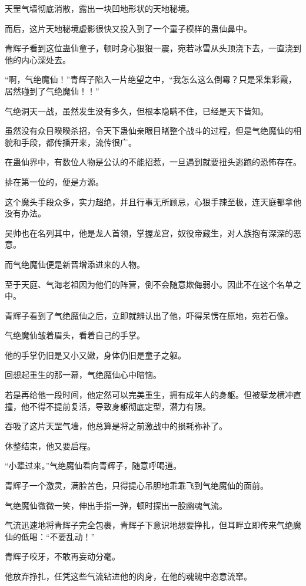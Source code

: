 \begin{this_body}
天罡气墙彻底消散，露出一块凹地形状的天地秘境。

而后，这片天地秘境虚影很快又投入到了一个童子模样的蛊仙鼻中。

青辉子看到这位蛊仙童子，顿时身心狠狠一震，宛若冰雪从头顶浇下去，一直浇到他的内心深处去。

“啊，气绝魔仙！”青辉子陷入一片绝望之中，“我怎么这么倒霉？只是采集彩霞，居然碰到了气绝魔仙！！”

气绝洞天一战，虽然发生没有多久，但根本隐瞒不住，已经是天下皆知。

虽然没有众目睽睽杀招，令天下蛊仙亲眼目睹整个战斗的过程，但是气绝魔仙的相貌和手段，都传播开来，流传很广。

在蛊仙界中，有数位人物是公认的不能招惹，一旦遇到就要扭头逃跑的恐怖存在。

排在第一位的，便是方源。

这个魔头手段众多，实力超绝，并且行事无所顾忌，心狠手辣至极，连天庭都拿他没有办法。

吴帅也在名列其中，他是龙人首领，掌握龙宫，奴役帝藏生，对人族抱有深深的恶意。

而气绝魔仙便是新晋增添进来的人物。

至于天庭、气海老祖因为他们的阵营，倒不会随意欺侮弱小。因此不在这个名单之中。

青辉子看到了气绝魔仙之后，立即就辨认出了他，吓得呆愣在原地，宛若石像。

气绝魔仙皱着眉头，看着自己的手掌。

他的手掌仍旧是又小又嫩，身体仍旧是童子之躯。

回想起重生的那一幕，气绝魔仙心中暗恼。

若是再给他一段时间，他定然可以完美重生，拥有成年人的身躯。但被孽龙横冲直撞，他不得不提前复活，导致身躯彻底定型，潜力有限。

吞吸了这片天罡气墙，他总算是将之前激战中的损耗弥补了。

休整结束，他又要启程。

“小辈过来。”气绝魔仙看向青辉子，随意呼喝道。

青辉子一个激灵，满脸苦色，只得提心吊胆地乖乖飞到气绝魔仙的面前。

气绝魔仙微微一笑，伸出手指一弹，顿时探出一股幽魂气流。

气流迅速地将青辉子完全包裹，青辉子下意识地想要挣扎，但耳畔立即传来气绝魔仙的低喝：“不要乱动！”

青辉子咬牙，不敢再妄动分毫。

他放弃挣扎，任凭这些气流钻进他的肉身，在他的魂魄中恣意流窜。


\end{this_body}
